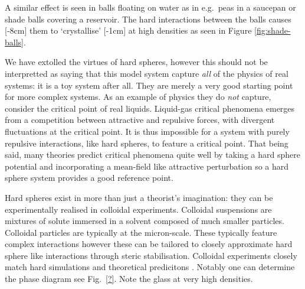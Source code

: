 \documentclass[11pt,twoside]{report}
\begin{document}
A similar effect is seen in balls floating on water as in e.g.\ peas in a saucepan or shade balls covering a reservoir.
The hard interactions between the balls causes%
[-8cm]
them to `crystallise'%
[-1cm]
at high densities as seen in Figure \ref{fig:shade-balls}.

We have extolled the virtues of hard spheres, however this should not be interpretted as saying that this model system capture \emph{all} of the physics of real systems: it is a toy system after all.
They are merely a very good starting point for more complex systems.
As an example of physics they do \emph{not} capture, consider the critical point of real liquids.
Liquid-gas critical phenomena emerges from a competition between attractive and repulsive forces, with divergent fluctuations at the critical point.
It is thus impossible for a system with purely repulsive interactions, like hard spheres, to feature a critical point.
That being said, many theories predict critical phenomena quite well by taking a hard sphere potential and incorporating a mean-field like attractive perturbation \cite{?} so a hard sphere system provides a good reference point.

Hard spheres exist in more than just a theorist's imagination: they can be experimentally realised in colloidal experiments.
Colloidal suspensions are mixtures of solute immersed in a solvent composed of much smaller particles.
Colloidal particles are typically at the micron-scale.
These typically feature complex interactions \cite{Royall?,?,?} however these can be tailored to closely approximate hard sphere like interactions through steric stabilisation.
Colloidal experiments closely match hard simulations and theoretical predicitons \cite{?}.
Notably one can determine the phase diagram see Fig.\ \ref{?}.
Note the glass at very high densities.
\end{document}
